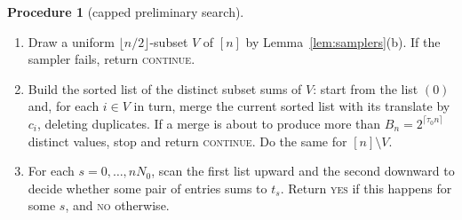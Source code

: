 \documentclass[11pt]{article}
\theoremstyle{definition}
\newtheorem{procedure}[lemma]{Procedure}
\newcommand{\floor}[1]{\lfloor #1\rfloor}
\newcommand{\ceil}[1]{\lceil #1\rceil}
\begin{document}
\begin{procedure}[capped preliminary search]\label{proc:prelim}
\begin{enumerate}[label=\arabic*.]
\item Draw a uniform $\floor{n/2}$-subset $V$ of $[n]$ by Lemma~\ref{lem:samplers}(b). If the sampler fails, return
\textsc{continue}.
\item Build the sorted list of the distinct subset sums of $V$: start from the list $(0)$ and, for each $i\in V$ in
turn, merge the current sorted list with its translate by $c_i$, deleting duplicates. If a merge is about to produce
more than $B_n=2^{\ceil{\tau_0n}}$ distinct values, stop and return \textsc{continue}. Do the same for
$[n]\setminus V$.
\item For each $s=0,\dots,nN_0$, scan the first list upward and the second downward to decide whether some pair of
entries sums to $t_s$. Return \textsc{yes} if this happens for some $s$, and \textsc{no} otherwise.
\end{enumerate}
\end{procedure}
\end{document}
